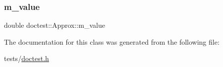 \subsubsection{\texorpdfstring{m\+\_\+value}{m\_value}}
{\footnotesize\ttfamily double doctest\+::\+Approx\+::m\+\_\+value\hspace{0.3cm}{\ttfamily [private]}}



The documentation for this class was generated from the following file\+:\begin{DoxyCompactItemize}
\item 
tests/\hyperlink{doctest_8h}{doctest.\+h}\end{DoxyCompactItemize}
